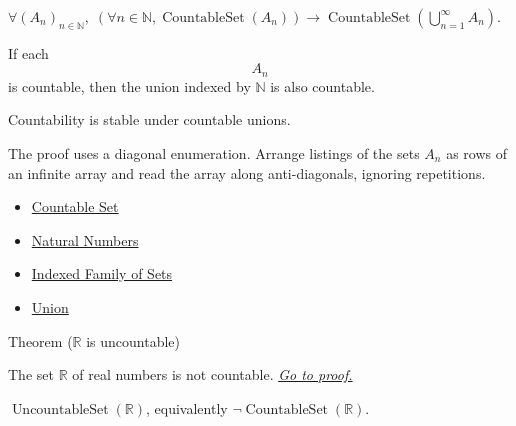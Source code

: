 \begin{remark*}
$\forall (A_n)_{n\in\mathbb{N}},\;
(\forall n\in\mathbb{N},\operatorname{CountableSet}(A_n))\to
\operatorname{CountableSet}(\bigcup_{n=1}^{\infty}A_n)$.
\end{remark*}

\begin{remark*}
If each \[
  A_n
\] is countable, then the union indexed by $\mathbb{N}$ is also
countable.
\end{remark*}

\begin{remark*}[Interpretation]
Countability is stable under countable unions.
\end{remark*}

\begin{remark*}[Exposition]
The proof uses a diagonal enumeration. Arrange listings of the sets $A_n$ as
rows of an infinite array and read the array along anti-diagonals, ignoring
repetitions.
\end{remark*}

\begin{dependencies}
\begin{itemize}
  \item \hyperref[def:countable]{Countable Set}
  \item \hyperref[def:natural-numbers]{Natural Numbers}
  \item \hyperref[def:indexed-family]{Indexed Family of Sets}
  \item \hyperref[def:union]{Union}
\end{itemize}
\end{dependencies}


\begin{theorembox}{Theorem ($\mathbb{R}$ is uncountable)}
\begin{theorem}\label{thm:R-uncountable}
The set $\mathbb{R}$ of real numbers is not countable.
\hyperref[prf:R-uncountable]{\textit{Go to proof.}}
\end{theorem}
\end{theorembox}

\begin{remark*}
$\operatorname{UncountableSet}(\mathbb{R})$, equivalently
$\neg\operatorname{CountableSet}(\mathbb{R})$.
\end{remark*}

